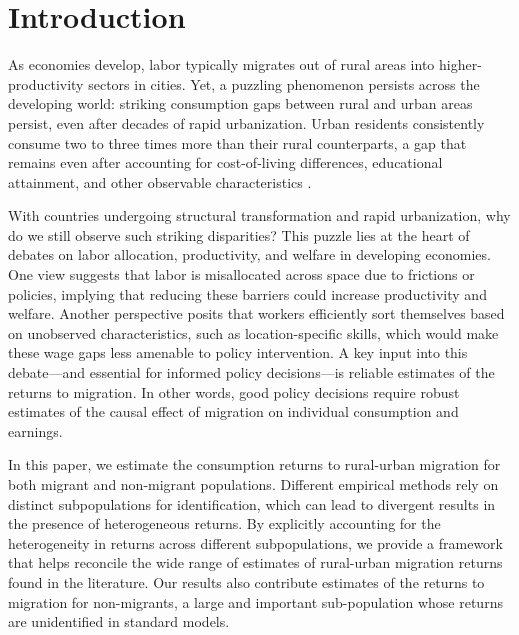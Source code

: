 \section{Introduction}\label{sec:intro}

As economies develop, labor typically migrates out of rural areas into higher-productivity sectors in cities. 
Yet, a puzzling phenomenon persists across the developing world: striking %
consumption gaps between rural and urban areas persist, even after decades of rapid urbanization. 
Urban residents consistently consume two to three times more than their rural counterparts, a gap that remains even after accounting for cost-of-living differences, educational attainment, and other observable characteristics   \citep{youngInequalityUrbanRuralGap2013,gollinAgriculturalProductivityGap2014,herrendorfWagesHumanCapital2018}. 

With countries undergoing structural transformation and rapid urbanization, why do we still observe such striking %
disparities? 
This puzzle lies at the heart of debates on labor allocation, productivity, and welfare in developing economies.
One view suggests that labor is misallocated across space due to frictions or policies, implying that reducing these barriers could increase productivity and welfare. 
Another perspective posits that workers efficiently sort themselves based on unobserved characteristics, such as location-specific skills, which would make these wage gaps less amenable to policy intervention.
A key input into this debate---and essential for informed policy decisions---is reliable estimates of the returns to migration. 
In other words, good policy decisions require robust estimates of the causal effect of migration on individual consumption and earnings.


In this paper, we estimate the consumption returns to rural-urban migration for both migrant and non-migrant populations. 
Different empirical methods rely on distinct subpopulations for identification, which can lead to divergent results in the presence of heterogeneous returns. 
By explicitly accounting for the heterogeneity in returns across different subpopulations, we provide a framework that helps reconcile the wide range of estimates of rural-urban migration returns found in the literature.
Our results also contribute estimates of the returns to migration for non-migrants, a large and important sub-population whose returns are unidentified in standard models. 


